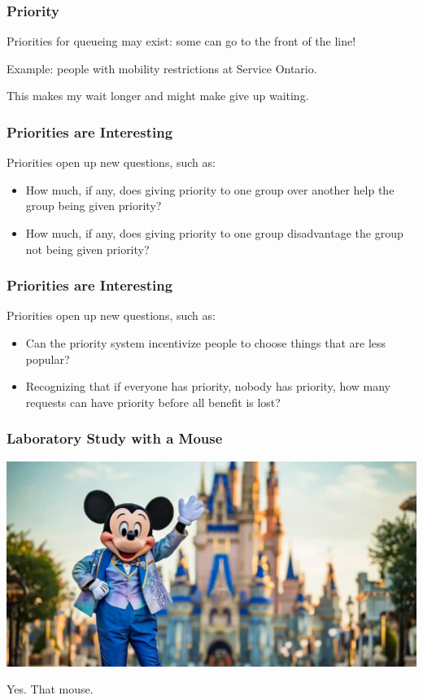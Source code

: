 \begin{frame}
\frametitle{Priority}

Priorities for queueing may exist: some can go to the front of the line!

Example: people with mobility restrictions at Service Ontario.

This makes my wait longer and might make give up waiting.

\end{frame}


\begin{frame}
\frametitle{Priorities are Interesting}

Priorities open up new questions, such as:

\begin{itemize}
	\item How much, if any, does giving priority to one group over another help the group being given priority? \vspace{3em}
	\item How much, if any, does giving priority to one group disadvantage the group not being given priority?
\end{itemize}

\end{frame}


\begin{frame}
\frametitle{Priorities are Interesting}

Priorities open up new questions, such as:

\begin{itemize}
	\item Can the priority system incentivize people to choose things that are less popular? \vspace{3em}
	\item Recognizing that if everyone has priority, nobody has priority, how many requests can have priority before all benefit is lost?
\end{itemize}

\end{frame}


\begin{frame}
\frametitle{Laboratory Study with a Mouse}

\begin{center}
	\includegraphics[width=\textwidth]{images/themouse.jpg}
\end{center}

Yes. That mouse.


\end{frame}






